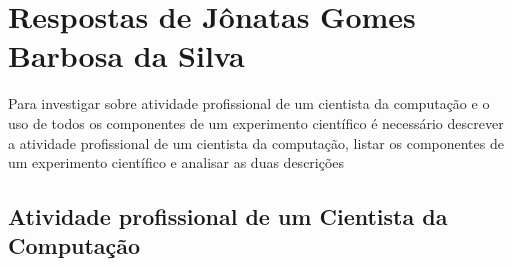 \section{Respostas de Jônatas Gomes Barbosa da Silva}
Para investigar sobre atividade profissional de um cientista da computação e o uso de todos os componentes de um experimento científico é necessário descrever a atividade profissional de um cientista da computação, listar os componentes de um experimento científico e analisar as duas descrições

\subsection{Atividade profissional de um Cientista da Computação}
